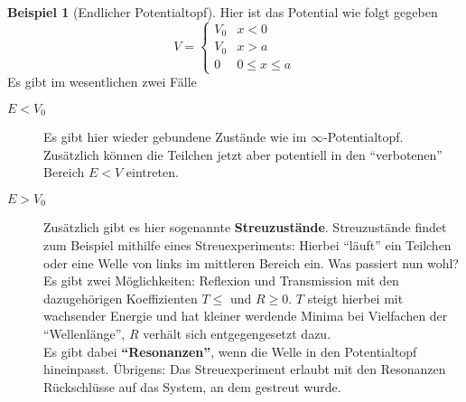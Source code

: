 \documentclass[oneside]{book}
\theoremstyle{definition}
\newtheorem*{beispiel*}{Beispiel}
\begin{document}
\begin{beispiel*}[Endlicher Potentialtopf]
	Hier ist das Potential wie folgt gegeben
	$$V = \begin{cases}
	V_0 & x < 0\\
	V_0 & x > a\\
	0 & 0 \le x \le a
	\end{cases}$$
	Es gibt im wesentlichen zwei Fälle
	\begin{description}
		\item[$E < V_0$] Es gibt hier wieder gebundene Zustände wie im $\infty$-Potentialtopf. Zusätzlich können die Teilchen jetzt aber potentiell in den "`verbotenen"' Bereich $E < V$ eintreten.
		\item[$E > V_0$] Zusätzlich gibt es hier sogenannte \textbf{Streuzustände}. Streuzustände findet zum Beispiel mithilfe eines Streuexperiments: Hierbei "`läuft"' ein Teilchen oder eine Welle von links im mittleren Bereich ein. Was passiert nun wohl?\\
		Es gibt zwei Möglichkeiten: Reflexion und Transmission mit den dazugehörigen Koeffizienten $T \leq$ und $R \geq 0$. $T$ steigt hierbei mit wachsender Energie und hat kleiner werdende Minima bei Vielfachen der "`Wellenlänge"', $R$ verhält sich entgegengesetzt dazu.\\
		 Es gibt dabei \textbf{"`Resonanzen"'}, wenn die Welle in den Potentialtopf hineinpasst. Übrigens: Das Streuexperiment erlaubt mit den Resonanzen Rückschlüsse auf das System, an dem gestreut wurde.
	\end{description}
\end{beispiel*}
\end{document}
